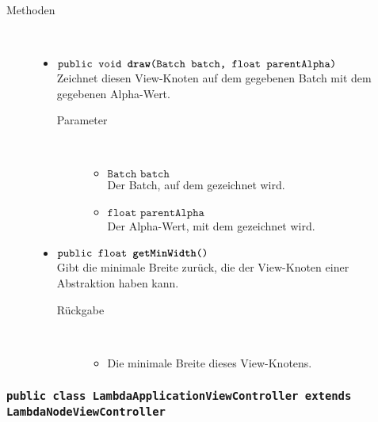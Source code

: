 \begin{description}
\item[Methoden] \hfill \\
	\vspace{-.8cm}
	\begin{itemize}
		\item $\texttt{public void \textbf{draw}(Batch batch, float parentAlpha)}$ \\ Zeichnet diesen View-Knoten auf dem gegebenen Batch mit dem gegebenen Alpha-Wert.
		\begin{description}
			\item[Parameter] \hfill \\
			\vspace{-.8cm}
			\begin{itemize}
				\item $\texttt{Batch batch}$ \\ Der Batch, auf dem gezeichnet wird.
				\item $\texttt{float parentAlpha}$ \\ Der Alpha-Wert, mit dem gezeichnet wird.
			\end{itemize}
		\end{description}
			
		\item $\texttt{public float \textbf{getMinWidth}()}$ \\ Gibt die minimale Breite zurück, die der View-Knoten einer Abstraktion haben kann.
		\begin{description}
			\item[Rückgabe] \hfill \\
			\vspace{-.8cm}
			\begin{itemize}
				\item Die minimale Breite dieses View-Knotens.
			\end{itemize}
		\end{description}
	\end{itemize}
\end{description}

\subsubsection{\normalfont \texttt{public class \textbf{LambdaApplicationViewController} extends LambdaNodeViewController}}

